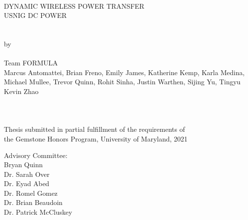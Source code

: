 
\thispagestyle{empty}
\hbox{\ }
\vspace{1in}
\renewcommand{\baselinestretch}{1}
\small\normalsize
\begin{center}

\large{{DYNAMIC WIRELESS POWER TRANSFER \\
USNIG DC POWER}}\\
\ \\
\ \\
\large{by} \\
\ \\
\large{Team FORMULA \\
Marcus Antomattei, Brian Freno, Emily James, Katherine Kemp, Karla Medina, Michael Mullee, Trevor Quinn, Rohit Sinha, Justin Warthen, Sijing Yu, Tingyu Kevin Zhao}%
\ \\
\ \\
\ \\
\ \\
\normalsize
Thesis submitted in partial fulfillment of the requirements of \\
the Gemstone Honors Program, University of Maryland, 2021 \\
\end{center}

\vspace{7.5em}

\noindent Advisory Committee: \\
Bryan Quinn \\
Dr. Sarah Over \\
Dr. Eyad Abed \\
Dr. Romel Gomez \\
Dr. Brian Beaudoin \\
Dr. Patrick McCluskey 

